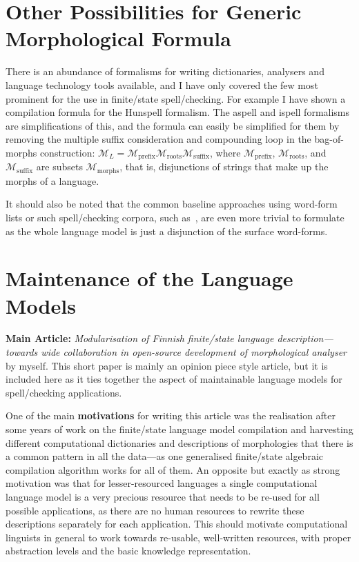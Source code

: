 \documentclass[officiallayout]{unihelcompling}
\begin{document}
\section{Other Possibilities for Generic Morphological Formula}
\label{sec:other-lms}

There is an abundance of formalisms for writing dictionaries, analysers and
language technology tools available, and I have only covered the few most
prominent for the use in finite\-/state spell\-/checking. For example I have
shown a compilation formula for the Hunspell formalism. The aspell and ispell
formalisms are simplifications of this, and the formula can easily be
simplified for them by removing the multiple suffix consideration and
compounding loop in the bag-of-morphs construction: $\mathcal{M}_L =
\mathcal{M}_\mathrm{prefix} \mathcal{M}_\mathrm{roots} \mathcal{M}_\mathrm{suffix}$, where $\mathcal{M}_\mathrm{prefix}$, $\mathcal{M}_\mathrm{roots}$, and 
$\mathcal{M}_\mathrm{suffix}$ are subsets $\mathcal{M}_\mathrm{morphs}$, that
is, disjunctions of strings that make up the morphs of a language.

It should also be noted that the common baseline approaches using word-form
lists or such spell\-/checking corpora, such as~\citet{norvig2010howto}, are
even more trivial to formulate as the whole language model is just a
disjunction of the surface word-forms.

\section{Maintenance of the Language Models}
\label{sec:maintenance}

\textbf{Main Article:} \emph{Modularisation of Finnish finite\-/state language 
description—towards wide collaboration in open-source development of
morphological analyser} by myself. This short paper is mainly an opinion
piece style article, but it is included here as it ties together the
aspect of maintainable language models for spell\-/checking applications.

One of the main \textbf{motivations} for writing this article was the
realisation after some years of work on the finite\-/state language model
compilation and harvesting different computational dictionaries and
descriptions of morphologies that there is a common pattern in all the
data---as one generalised finite\-/state algebraic compilation algorithm works
for all of them. An opposite but exactly as strong motivation was that for
lesser-resourced languages a single computational language model is a very
precious resource that needs to be re-used for all possible applications, as
there are no human resources to rewrite these descriptions separately for each
application. This should motivate computational linguists in general to work
towards re-usable, well-written resources, with proper abstraction levels and
the basic knowledge representation.
\end{document}
